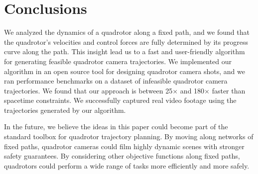 \section{Conclusions}

We analyzed the dynamics of a quadrotor along a fixed path, and we found that the quadrotor's velocities and control forces are fully determined by its progress curve along the path.
This insight lead us to a fast and user-friendly algorithm for generating feasible quadrotor camera trajectories.
We implemented our algorithm in an open source tool for designing quadrotor camera shots, and we ran performance benchmarks on a dataset of infeasible quadrotor camera trajectories.
We found that our approach is between 25$\times$ and 180$\times$ faster than spacetime constraints.
We successfully captured real video footage using the trajectories generated by our algorithm.

In the future, we believe the ideas in this paper could become part of the standard toolbox for quadrotor trajectory planning.
By moving along networks of fixed paths, quadrotor cameras could film highly dynamic scenes with stronger safety guarantees.
By considering other objective functions along fixed paths, quadrotors could perform a wide range of tasks more efficiently and more safely.
